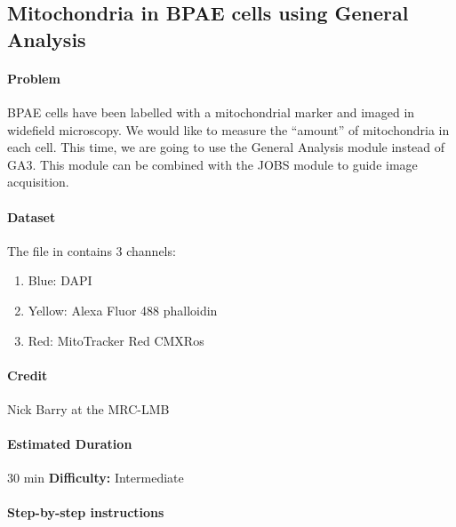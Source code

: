 \subsection{Mitochondria in BPAE cells using General Analysis} \label{sec:bpae-mitochondria}

\paragraph{Problem}
BPAE cells have been labelled with a mitochondrial marker and imaged in widefield microscopy. We would like to measure the ``amount'' of mitochondria in each cell. This time, we are going to use the General Analysis module instead of GA3. This module can be combined with the JOBS module to guide image acquisition.

\paragraph{Dataset} The file in  contains 3 channels:
\begin{enumerate}\itemsep0em
    \item Blue: DAPI
    \item Yellow: Alexa Fluor 488 phalloidin
    \item Red: MitoTracker Red CMXRos
\end{enumerate}

\paragraph{Credit} Nick Barry at the MRC-LMB

\paragraph{Estimated Duration} 30 min \quad \textbf{Difficulty:} Intermediate

\paragraph{Step-by-step instructions}
